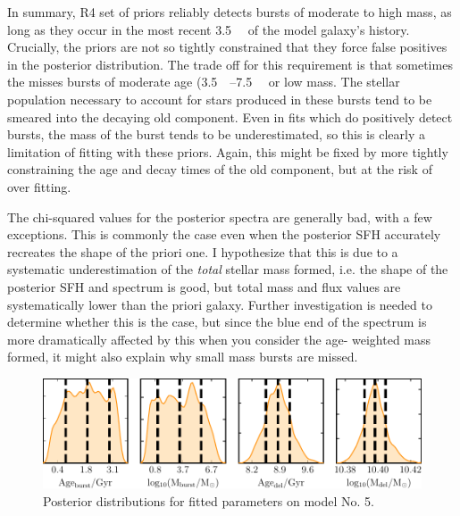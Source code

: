 \documentclass[a4paper,12pt]{article}
\begin{document}
In summary, R4 set of priors reliably detects bursts of moderate to high mass,
as long as they occur in the most recent \SI{3.5}{\giga\year} of the model
galaxy's history. Crucially, the priors are not so tightly constrained that
they force false positives in the posterior distribution. The trade off for
this requirement is that sometimes the misses bursts of moderate age
(\SIrange{3.5}{7.5}{\giga\year} or low mass. The stellar population necessary
to account for stars produced in these bursts tend to be smeared into the
decaying old component. Even in fits which do positively detect bursts, the
mass of the burst tends to be underestimated, so this is clearly a limitation
of fitting with these priors. Again, this might be fixed by more tightly
constraining the age and decay times of the old component, but at the risk of
over fitting.

The chi-squared values for the posterior spectra are generally bad, with a few
exceptions. This is commonly the case even when the posterior SFH accurately
recreates the shape of the priori one. I hypothesize that this is due to a
systematic underestimation of the \textit{total} stellar mass formed, i.e. the
shape of the posterior SFH and spectrum is good, but total mass and flux values
are systematically lower than the priori galaxy. Further investigation is
needed to determine whether this is the case, but since the blue end of the
spectrum is more dramatically affected by this when you consider the age-
weighted mass formed, it might also explain why small mass bursts are missed.

\begin{figure}[h]
  \includegraphics[width=\textwidth]{phil_model_5_posterior}
  \caption{Posterior distributions for fitted parameters on model No. 5.}
  \label{fig:phil_model_5_posterior}
\end{figure}
\end{document}
